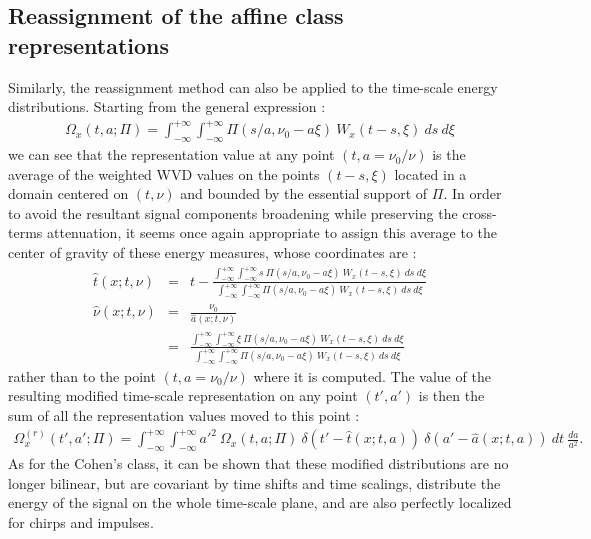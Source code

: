 \subsection{Reassignment of the affine class representations}  
  Similarly, the reassignment method can also be applied to the
time-scale energy distributions. Starting from the general 
expression :
\begin{eqnarray*}
\Omega_x(t,a;\Pi)=\int_{-\infty}^{+\infty}\int_{-\infty}^{+\infty}
\Pi(s/a,\nu_0-a \xi)\ W_x(t-s,\xi)\ ds\ d\xi 
\end{eqnarray*}
we can see that the representation value at any point $(t,a=\nu_0/\nu)$ is
the average of the weighted WVD values on the points $(t-s,\xi)$ located in
a domain centered on $(t,\nu)$ and bounded by the essential support of
$\Pi$. In order to avoid the resultant signal components broadening while
preserving the cross-terms attenuation, it seems once again appropriate to
assign this average to the center of gravity of these energy measures,
whose coordinates are :
\begin{eqnarray*}
\hat{t}(x;t,\nu) &=&
t-\frac{\int_{-\infty}^{+\infty}\int_{-\infty}^{+\infty} s\
\Pi(s/a,\nu_0-a \xi)\ W_x(t-s,\xi)\ ds\ d\xi} 
 {\int_{-\infty}^{+\infty}\int_{-\infty}^{+\infty} \Pi(s/a,\nu_0-a \xi)\
W_x(t-s,\xi)\ ds\ d\xi}	\\ 
\hat{\nu}(x;t,\nu) &=& \frac{\nu_0}{\hat{a}(x;t,\nu)}\\
 &=& \frac{\int_{-\infty}^{+\infty}\int_{-\infty}^{+\infty} \xi\
\Pi(s/a,\nu_0-a \xi)\ W_x(t-s,\xi)\ ds\ d\xi} 
   {\int_{-\infty}^{+\infty}\int_{-\infty}^{+\infty} \Pi(s/a,\nu_0-a \xi)\
W_x(t-s,\xi)\ ds\ d\xi}	 
\end{eqnarray*}
rather than to the point $(t,a=\nu_0/\nu)$ where it is computed. The value
of the resulting modified time-scale representation on any point
$(t',a')$ is then the sum of all the representation values moved to this
point :
\begin{eqnarray*}
\Omega_x^{(r)}(t',a';\Pi)=\int_{-\infty}^{+\infty}\int_{-\infty}^{+\infty}
{a'}^2\ \Omega_x(t,a;\Pi)\  
 \delta(t'-\hat{t}(x;t,a))\ \delta(a'-\hat{a}(x;t,a))\ dt\ \frac{da}{a^2}.
\end{eqnarray*}
As for the Cohen's class, it can be shown that these modified
distributions are no longer bilinear, but are covariant by time shifts
and time scalings, distribute the energy of the signal on the whole
time-scale plane, and are also perfectly localized for chirps and
impulses. 


